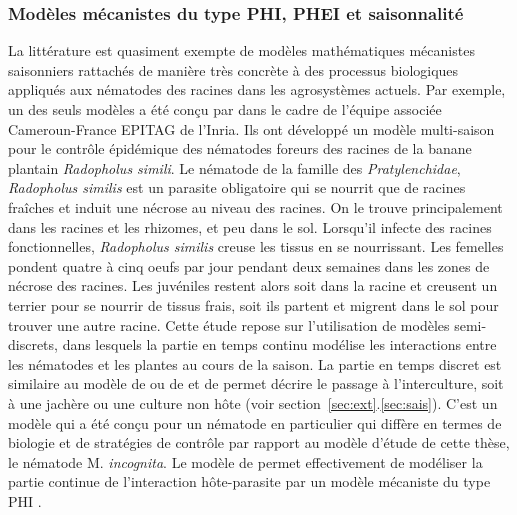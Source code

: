 	 
	
	
	
	\subsubsection{Modèles mécanistes du type PHI, PHEI et saisonnalité}
	La littérature est quasiment exempte de modèles mathématiques mécanistes saisonniers rattachés de manière très concrète à des processus biologiques appliqués aux
nématodes des racines dans les agrosystèmes actuels. Par exemple, un des seuls modèles a été conçu
par \citet{Tankam-Chedjou2020}  dans le cadre de l’équipe associée Cameroun-France EPITAG de l’Inria. Ils  ont développé  un modèle  multi-saison pour le contrôle épidémique des nématodes foreurs des racines de la banane plantain \textit{Radopholus simili}. Le nématode de la famille des \textit{Pratylenchidae}, \textit{Radopholus similis} est un parasite obligatoire qui  se nourrit que de racines fraîches et induit une nécrose au niveau des  racines. On le trouve principalement dans les racines et les rhizomes, et peu dans le sol. Lorsqu'il infecte des racines fonctionnelles, \textit{Radopholus similis} creuse les tissus en se nourrissant. Les femelles pondent quatre à cinq oeufs par jour pendant deux semaines dans les zones de nécrose des racines. Les juvéniles restent alors soit dans la racine et creusent un terrier pour se nourrir de tissus frais, soit ils partent et migrent dans le sol pour trouver une autre racine.
Cette étude repose  sur l’utilisation de modèles semi-discrets, dans lesquels la partie en temps continu modélise les interactions entre les nématodes et les plantes au cours de la saison. La partie en temps discret est similaire au modèle de \citet{Hamelin2011} ou de  \citet{Mailleret2012} et de permet  décrire le passage à l'interculture, soit à une jachère ou une culture non hôte (voir section~\ref{sec:ext}.\ref{sec:sais}).  C'est un modèle qui a été conçu  pour un nématode en particulier qui diffère  en termes de biologie et de stratégies de contrôle par rapport au modèle d'étude de cette thèse, le nématode M. \textit{incognita}.
	 Le modèle de  \citet{Tankam-Chedjou2020} permet effectivement de modéliser la  partie continue de l’interaction hôte-parasite  par un modèle mécaniste du type \og PHI \fg . 
	

